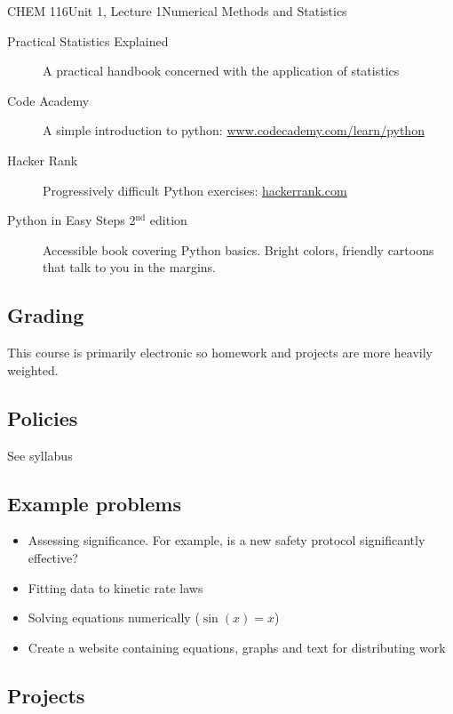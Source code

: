 \documentclass{article}
\begin{document}
\begin{tdoc}{CHEM 116}{Unit 1, Lecture 1}{Numerical Methods and Statistics}
\begin{description}
\item[Practical Statistics Explained]{A practical handbook concerned with the application of statistics}

\item[Code Academy]{A simple introduction to python: \href{https://www.codecademy.com/learn/python}{www.codecademy.com/learn/python}}

\item[Hacker Rank]{Progressively difficult Python exercises: \href{https://www.hackerrank.com}{hackerrank.com}}

\item[Python in Easy Steps 2$^{\textrm{nd}}$ edition]{Accessible book covering Python basics. Bright colors, friendly cartoons that talk to you in the margins.}

\end{description}

\subsection{Grading}

This course is primarily electronic so homework and projects are more
heavily weighted.

\subsection{Policies}
See syllabus

\subsection{Example problems}

\begin{itemize}

\item Assessing significance. For example, is a new safety protocol significantly effective?
\item Fitting data to kinetic rate laws
\item Solving equations numerically ($\sin(x) = x$)
\item Create a website containing equations, graphs and text for distributing work

\end{itemize}

\subsection{Projects}


\end{tdoc}
\end{document}
